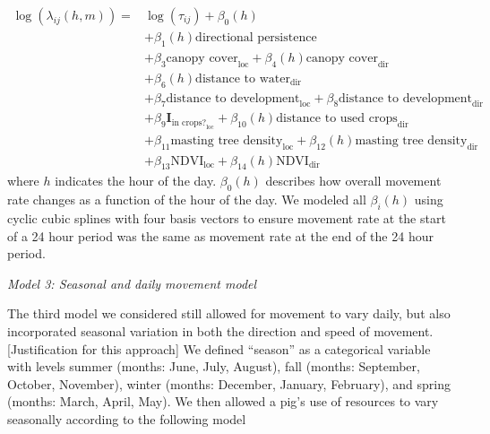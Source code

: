 \documentclass[a4paper]{article}
\begin{document}
\begin{align}
  \log(\lambda_{ij}(h, m)) = & \log(\tau_{ij}) + \beta_0(h) \\
  & + \beta_1(h) \text{directional persistence} \\
  & + \beta_{3} \text{canopy cover}_{\text{loc}} + \beta_{4}(h) \text{canopy cover}_{\text{dir}} \\
  & + \beta_6(h) \text{distance to water}_{\text{dir}} \\
  & + \beta_7 \text{distance to development}_{\text{loc}} + \beta_8 \text{distance to development}_{\text{dir}} \\
  & + \beta_9\mathbf{I}_{\text{in crops?}_{\text{loc}}} + \beta_{10}(h) \text{distance to used crops}_{\text{dir}} \\
  & + \beta_{11} \text{masting tree density}_{\text{loc}} + \beta_{12}(h) \text{masting tree density}_{\text{dir}} \\
  & + \beta_{13} \text{NDVI}_{\text{loc}} + \beta_{14}(h) \text{NDVI}_{\text{dir}}
\end{align}
where $h$ indicates the hour of the day.  $\beta_0(h)$ describes how overall movement rate changes as a function of the hour of the day. We modeled all $\beta_i(h)$ using cyclic cubic splines with four basis vectors \citep{Wood2006} to ensure movement rate at the start of a 24 hour period was the same as movement rate at the end of the 24 hour period.

\bigskip
\noindent
\emph{Model 3: Seasonal and daily movement model}

The third model we considered still allowed for movement to vary daily, but also incorporated seasonal variation in both the direction and speed of movement. [Justification for this approach] We defined ``season'' as a categorical variable with levels summer (months: June, July, August), fall (months: September, October, November), winter (months: December, January, February), and spring (months: March, April, May). We then allowed a pig's use of resources to vary seasonally according to the following model
\end{document}

